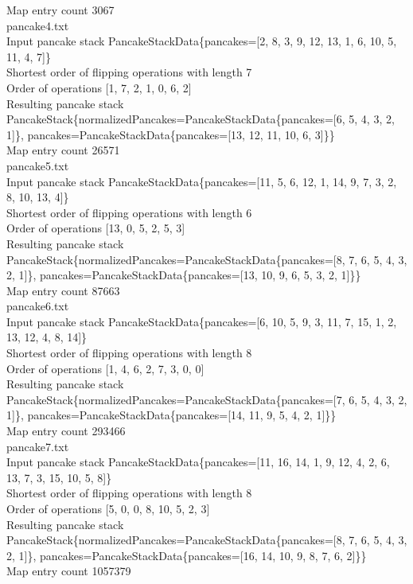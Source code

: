 Map entry count 3067 \\
pancake4.txt \\
Input pancake stack PancakeStackData\{pancakes=[2, 8, 3, 9, 12, 13, 1, 6, 10, 5, 11, 4, 7]\} \\
Shortest order of flipping operations with length 7 \\
Order of operations [1, 7, 2, 1, 0, 6, 2] \\
Resulting pancake stack PancakeStack\{normalizedPancakes=PancakeStackData\{pancakes=[6, 5, 4, 3, 2, 1]\}, pancakes=PancakeStackData\{pancakes=[13, 12, 11, 10, 6, 3]\}\} \\
Map entry count 26571 \\
pancake5.txt \\
Input pancake stack PancakeStackData\{pancakes=[11, 5, 6, 12, 1, 14, 9, 7, 3, 2, 8, 10, 13, 4]\} \\
Shortest order of flipping operations with length 6 \\
Order of operations [13, 0, 5, 2, 5, 3] \\
Resulting pancake stack PancakeStack\{normalizedPancakes=PancakeStackData\{pancakes=[8, 7, 6, 5, 4, 3, 2, 1]\}, pancakes=PancakeStackData\{pancakes=[13, 10, 9, 6, 5, 3, 2, 1]\}\} \\
Map entry count 87663 \\
pancake6.txt \\
Input pancake stack PancakeStackData\{pancakes=[6, 10, 5, 9, 3, 11, 7, 15, 1, 2, 13, 12, 4, 8, 14]\} \\
Shortest order of flipping operations with length 8 \\
Order of operations [1, 4, 6, 2, 7, 3, 0, 0] \\
Resulting pancake stack PancakeStack\{normalizedPancakes=PancakeStackData\{pancakes=[7, 6, 5, 4, 3, 2, 1]\}, pancakes=PancakeStackData\{pancakes=[14, 11, 9, 5, 4, 2, 1]\}\} \\
Map entry count 293466 \\
pancake7.txt \\
Input pancake stack PancakeStackData\{pancakes=[11, 16, 14, 1, 9, 12, 4, 2, 6, 13, 7, 3, 15, 10, 5, 8]\} \\
Shortest order of flipping operations with length 8 \\
Order of operations [5, 0, 0, 8, 10, 5, 2, 3] \\
Resulting pancake stack PancakeStack\{normalizedPancakes=PancakeStackData\{pancakes=[8, 7, 6, 5, 4, 3, 2, 1]\}, pancakes=PancakeStackData\{pancakes=[16, 14, 10, 9, 8, 7, 6, 2]\}\} \\
Map entry count 1057379 \\

